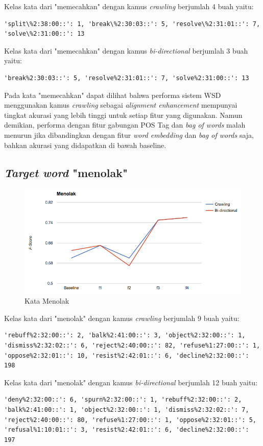 Kelas kata dari "memecahkan" dengan kamus \textit{crawling} berjumlah 4 buah yaitu:
\begin{lstlisting}
'split\%2:38:00::': 1, 'break\%2:30:03::': 5, 'resolve\%2:31:01::': 7, 'solve\%2:31:00::': 13
\end{lstlisting}
Kelas kata dari "memecahkan" dengan kamus \textit{bi-directional} berjumlah 3 buah yaitu:
\begin{lstlisting}
'break%2:30:03::': 5, 'resolve%2:31:01::': 7, 'solve%2:31:00::': 13
\end{lstlisting}

Pada kata "memecahkan" dapat dilihat bahwa performa sistem WSD menggunakan kamus \textit{crawling} sebagai \textit{alignment enhancement} mempunyai tingkat akurasi yang lebih tinggi untuk setiap fitur yang digunakan. Namun demikian, performa dengan fitur gabungan POS Tag dan \textit{bag of words} malah menurun jika dibandingkan dengan fitur \textit{word embedding} dan \textit{bag of words} saja, bahkan akurasi yang didapatkan di bawah baseline.

\subsection{\textit{Target word} "menolak"}

\begin{figure}
	\centering
	\includegraphics[width=1\linewidth]{adit_pics/menolak.png}
	\caption{Kata Menolak}
	\label{fig:menolak}
\end{figure}


Kelas kata dari "menolak" dengan kamus \textit{crawling} berjumlah 9 buah yaitu:
\begin{lstlisting}
'rebuff%2:32:00::': 2, 'balk%2:41:00::': 3, 'object%2:32:00::': 1, 'dismiss%2:32:02::': 6, 'reject%2:40:00::': 82, 'refuse%1:27:00::': 1, 'oppose%2:32:01::': 10, 'resist%2:42:01::': 6, 'decline%2:32:00::': 198
\end{lstlisting}
Kelas kata dari "menolak" dengan kamus \textit{bi-directional} berjumlah 12 buah yaitu:
\begin{lstlisting}
'deny%2:32:00::': 6, 'spurn%2:32:00::': 1, 'rebuff%2:32:00::': 2, 'balk%2:41:00::': 1, 'object%2:32:00::': 1, 'dismiss%2:32:02::': 7, 'reject%2:40:00::': 80, 'refuse%1:27:00::': 1, 'oppose%2:32:01::': 5, 'refusal%1:10:01::': 3, 'resist%2:42:01::': 6, 'decline%2:32:00::': 197
\end{lstlisting}

